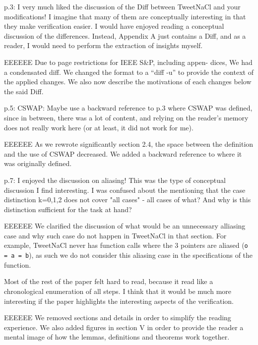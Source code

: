 p.3: I very much liked the discussion of the Diff between
TweetNaCl and your modifications! I imagine that many of
them are conceptually interesting in that they make verification
easier. I would have enjoyed reading a conceptual discussion
of the differences. Instead, Appendix A just contains a
Diff, and as a reader, I would need to perform the extraction
of insights myself.

\begin{answer}{EEEEEE}
Due to page restrictions for IEEE S\&P, including appen-
dices, We had a condensated diff. We changed the format to
a ``diff -u'' to provide the context of the applied changes. We
also now describe the motivations of each changes below
the said Diff.
\end{answer}

p.5: CSWAP: Maybe use a backward reference to p.3 where
CSWAP was defined, since in between, there was a lot of
content, and relying on the reader's memory does not really
work here (or at least, it did not work for me).

\begin{answer}{EEEEEE}
As we rewrote significantly section 2.4, the space between
the definition and the use of CSWAP decreased. We added a
backward reference to where it was originally defined.
\end{answer}

p.7: I enjoyed the discussion on aliasing! This was the type
of conceptual discussion I find interesting. I was confused
about the mentioning that the case distinction k=0,1,2 does
not cover "all cases" - all cases of what? And why is this
distinction sufficient for the task at hand?

\begin{answer}{EEEEEE}
We clarified the discussion of what would be an unnecessary
alliasing case and why such case do not happen in
TweetNaCl in that section. For example, TweetNaCl never
has function calls where the 3 pointers are aliased (\texttt{o = a = b}),
as such we do not consider this aliasing case in the
specifications of the function.
\end{answer}

Most of the rest of the paper felt hard to read, because it
read like a chronological enumeration of all steps. I think that
it would be much more interesting if the paper highlights the
interesting aspects of the verification.

\begin{answer}{EEEEEE}
We removed sections and details in order to simplify the
reading experience. We also added figures in section V in
order to provide the reader a mental image of how the lemmas,
definitions and theorems work together.
\end{answer}


